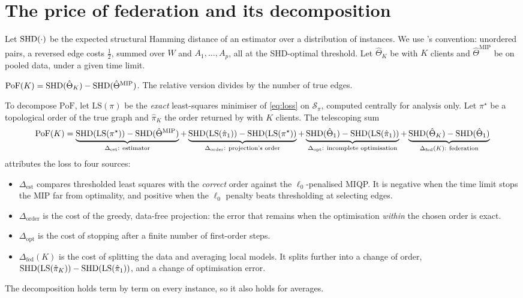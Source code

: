 \section{The price of federation and its decomposition}
\label{sec:price}

Let $\mathrm{SHD}(\cdot)$ be the expected structural Hamming distance of an estimator over a
distribution of instances. We use \exdbn's convention: unordered pairs, a reversed edge costs
$\tfrac12$, summed over $W$ and $A_1,\dots,A_p$, all at the SHD-optimal threshold. Let
$\hat\Theta_K$ be \feddbn{} with $K$ clients and $\hat\Theta^{\mathrm{MIP}}$ be \exdbn{} on
pooled data, under a given time limit.

\begin{definition}
$\mathrm{PoF}(K)=\mathrm{SHD}(\hat\Theta_K)-\mathrm{SHD}(\hat\Theta^{\mathrm{MIP}})$.
The relative version divides by the number of true edges.
\end{definition}

To decompose $\mathrm{PoF}$, let $\mathrm{LS}(\pi)$ be the \emph{exact} least-squares
minimiser of \eqref{eq:loss} on $\mathcal{S}_\pi$, computed centrally for analysis only. Let
$\pi^\star$ be a topological order of the true graph and $\hat\pi_K$ the order returned by
\feddbn{} with $K$ clients. The telescoping sum
\begin{equation}
\label{eq:decomp}
\mathrm{PoF}(K)=
\underbrace{\shd(\mathrm{LS}(\pi^\star))-\shd(\hat\Theta^{\mathrm{MIP}})}_{\Delta_{\mathrm{est}}:\ \text{estimator}}
+\underbrace{\shd(\mathrm{LS}(\hat\pi_1))-\shd(\mathrm{LS}(\pi^\star))}_{\Delta_{\mathrm{order}}:\ \text{projection's order}}
+\underbrace{\shd(\hat\Theta_1)-\shd(\mathrm{LS}(\hat\pi_1))}_{\Delta_{\mathrm{opt}}:\ \text{incomplete optimisation}}
+\underbrace{\shd(\hat\Theta_K)-\shd(\hat\Theta_1)}_{\Delta_{\mathrm{fed}}(K):\ \text{federation}}
\end{equation}
attributes the loss to four sources:
\begin{itemize}
\item $\Delta_{\mathrm{est}}$ compares thresholded least squares with the \emph{correct} order
against the $\ell_0$-penalised MIQP. It is negative when the time limit stops the MIP far
from optimality, and positive when the $\ell_0$ penalty beats thresholding at selecting edges.
\item $\Delta_{\mathrm{order}}$ is the cost of the greedy, data-free projection: the error
that remains when the optimisation \emph{within} the chosen order is exact.
\item $\Delta_{\mathrm{opt}}$ is the cost of stopping after a finite number of first-order
steps.
\item $\Delta_{\mathrm{fed}}(K)$ is the cost of splitting the data and averaging local models.
It splits further into a change of order,
$\mathrm{SHD}(\mathrm{LS}(\hat\pi_K))-\mathrm{SHD}(\mathrm{LS}(\hat\pi_1))$, and a change of
optimisation error.
\end{itemize}
The decomposition holds term by term on every instance, so it also holds for averages.


